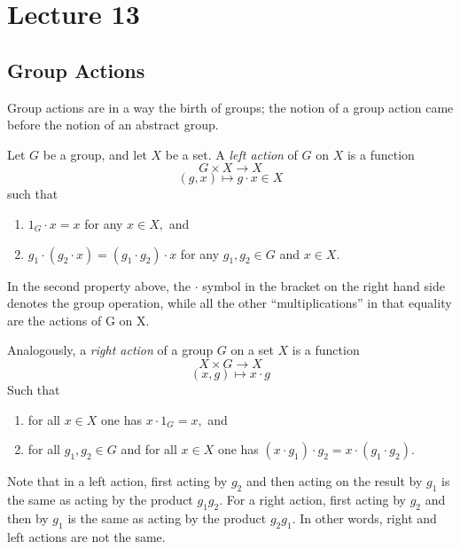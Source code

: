 \section{Lecture 13}
\subsection{Group Actions}
Group actions are in a way the birth of groups; the notion of a group action came before the notion of an abstract group.
\begin{definition} 
  Let $G$ be a group, and let $X$ be a set. A \emph{left action} of $G$ on $X$ is a function
  \[G\times X \to X\]
  \[(g,x)\mapsto g\cdot x\in X\]
  such that 
  \begin{enumerate}
    \item $1_G \cdot x=x$ for any $x\in X,$ and
    \item $g_1 \cdot (g_2\cdot x) = (g_1\cdot g_2)\cdot x$ for any $g_1,g_2\in G$ and $x\in X$.
  \end{enumerate}
 
  \label{def:leftAction}
\end{definition}
\begin{remark}
     In the second property above, the $\cdot$ symbol in the bracket on the right hand side denotes the group operation, while all the other “multiplications” in that equality are the actions of G on X.
\end{remark}

\begin{definition}
  Analogously, a \emph{right action} of a group $G$ on a set $X$ is a function
  \[X\times G \to X\]
  \[(x,g)\mapsto x\cdot g\]
  Such that
  \begin{enumerate}
    \item for all $x\in X$ one has $x\cdot 1_G=x,$ and
    \item for all $g_1,g_2\in G$ and for all $x\in X$ one has $(x\cdot g_1)\cdot g_2 =
      x\cdot (g_1\cdot g_2)$.
  \end{enumerate}
  \label{def:rightAction}
\end{definition}

\begin{remark}
    Note that in a left action, first acting by $g_2$ and then acting on the result by $g_1$ is the same as acting by the product $g_1g_2$. For a right action, first acting by $g_2$ and then by $g_1$ is the same as acting by the product $g_2g_1$. In other words, right and left actions are not the same.
\end{remark}


